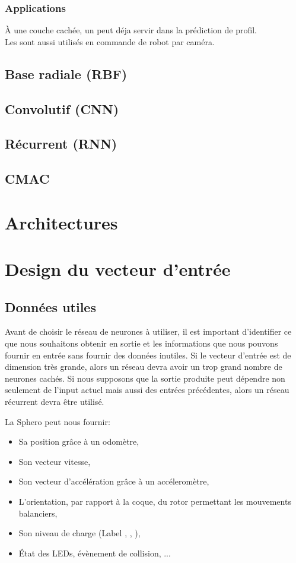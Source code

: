 \documentclass[12pt,a4paper,oneside, titlepage]{article}
\begin{document}
\subsubsection*{Applications}
À une couche cachée, un \mlp peut déja servir dans la prédiction de profil.\cite{statistica}\\
Les \mlp sont aussi utilisés en commande de robot par caméra.\cite{Pomerleau}

\subsection{Base radiale (RBF)}


\subsection{Convolutif (CNN)}
\subsection{Récurrent (RNN)}
\subsection{CMAC}
\section{Architectures}
\section{Design du vecteur d'entrée}
\subsection{Données utiles}
Avant de choisir le réseau de neurones à utiliser, il est important d'identifier ce que nous souhaitons obtenir en sortie et les informations que nous pouvons fournir en entrée sans fournir des données inutiles.
Si le vecteur d'entrée est de dimension très grande, alors un réseau \rbf devra avoir un trop grand nombre de neurones cachés\cite{Gauthier}.
Si nous supposons que la sortie produite peut dépendre non seulement de l'input actuel mais aussi des entrées précédentes, alors un réseau récurrent devra être utilisé.

La Sphero peut nous fournir:
\begin{itemize}%
 \item Sa position grâce à un odomètre,
 \item Son vecteur vitesse,
 \item Son vecteur d'accélération grâce à un accéleromètre,
 \item L'orientation, par rapport à la coque, du rotor permettant les mouvements balanciers,
 \item Son niveau de charge (Label , , ),%
 \item État des LEDs, évènement de collision, ... %
\end{itemize}
\end{document}
